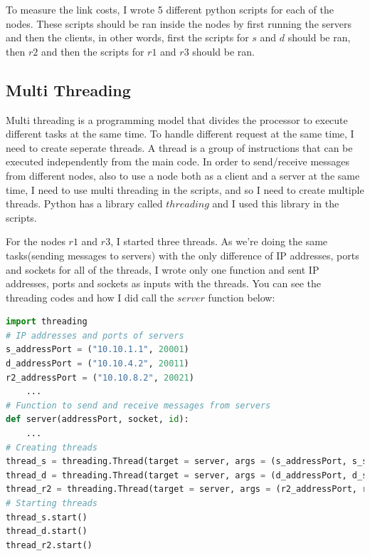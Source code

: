 \documentclass[conference]{IEEEtran}
\begin{document}
To measure the link costs, I wrote 5 different python scripts for each of the nodes. These scripts should be ran inside the nodes by first running the servers and then the clients, in other words, first the scripts for $s$ and $d$ should be ran, then $r2$ and then the scripts for $r1$ and $r3$ should be ran.

\subsection{Multi Threading}
Multi threading is a programming model that divides the processor to execute different tasks at the same time. To handle different request at the same time, I need to create seperate threads. A thread is a group of instructions that can be executed independently from the main code. In order to send/receive messages from different nodes, also to use a node both as a client and a server at the same time, I need to use multi threading in the scripts, and so I need to create multiple threads. Python has a library called $threading$ and I used this library in the scripts.

For the nodes $r1$ and $r3$, I started three threads. As we're doing the same tasks(sending messages to servers) with the only difference of IP addresses, ports and sockets for all of the threads, I wrote only one function and sent IP addresses, ports and sockets as inputs with the threads. You can see the threading codes and how I did call the $server$ function below:
\begin{lstlisting}[language=Python, caption=Multithreading in Python]
import threading
# IP addresses and ports of servers
s_addressPort = ("10.10.1.1", 20001)
d_addressPort = ("10.10.4.2", 20011)
r2_addressPort = ("10.10.8.2", 20021)
    ...
# Function to send and receive messages from servers
def server(addressPort, socket, id):
    ...
# Creating threads
thread_s = threading.Thread(target = server, args = (s_addressPort, s_socket, 's'))
thread_d = threading.Thread(target = server, args = (d_addressPort, d_socket, 'd'))
thread_r2 = threading.Thread(target = server, args = (r2_addressPort, r2_socket, 'r2'))
# Starting threads
thread_s.start()
thread_d.start()
thread_r2.start()
\end{lstlisting}
\end{document}
